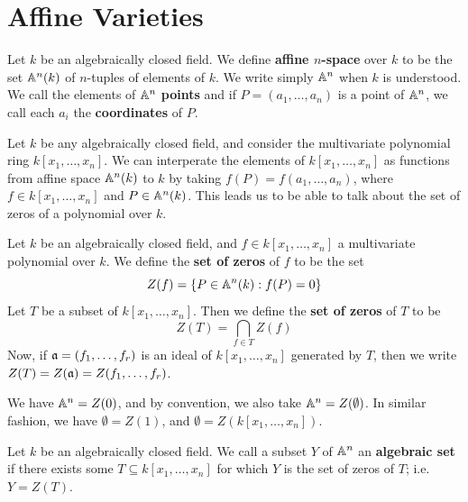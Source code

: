 \section{Affine Varieties}

\begin{definition}
    Let $k$ be an algebraically closed field. We define  \textbf{affine
    $n$-space} over $k$ to be the set $\mathbb{A}^n(k)$ of $n$-tuples of elements of
    $k$. We write simply $\mathbb{A}^n$ when  $k$ is understood. We call the elements of
    $\mathbb{A}^n$  \textbf{points} and if $P=(a_1, \dots, a_n)$ is a point of $\mathbb{A}^n$,
    we call each $a_i$ the \textbf{coordinates} of $P$.
\end{definition}

\begin{example}\label{example_1.1}
    Let $k$ be any algebraically closed field, and consider the multivariate
    polynomial ring $k[x_1, \dots, x_n]$. We can interperate the elements of
    $k[x_1, \dots, x_n]$ as functions from affine space $\mathbb{A}^n(k)$ to $k$ by
    taking  $f(P)=f(a_1, \dots, a_n)$, where $f \in k[x_1, \dots, x_n]$ and $P
    \in \mathbb{A}^n(k)$. This leads us to be able to talk about the set of zeros of a
    polynomial over $k$.
\end{example}

\begin{definition}
    Let $k$ be an algebraically closed field, and $f \in k[x_1, \dots, x_n]$ a
    multivariate polynomial over $k$. We define the \textbf{set of zeros} of $f$
    to be the set
    \begin{equation*}
        Z(f)=\{P \in \mathbb{A}^n(k) : f(P)=0\}
    \end{equation*}
    Let $T$ be a subset of  $k[x_1, \dots, x_n]$. Then we define the \textbf{set
    of zeros} of $T$ to be
    \begin{equation*}
        Z(T)=\bigcap_{f \in T}{Z(f)}
    \end{equation*}
    Now, if $\mathfrak{a}=(f_1, \dots, f_r)$ is an ideal of  $k[x_1, \dots, x_n]$ generated
    by $T$, then we write  $Z(T)=Z(\mathfrak{a})=Z(f_1, \dots, f_r)$.
\end{definition}

\begin{example}\label{example_1.2}
    We have $\mathbb{A}^n=Z(0)$, and by convention, we also take $\mathbb{A}^n=Z(\emptyset)$. In
    similar fashion, we have $\emptyset=Z(1)$, and $\emptyset=Z(k[x_1, \dots,
    x_n])$.
\end{example}

\begin{definition}
    Let $k$ be an algebraically closed field. We call a subset $Y$ of $\mathbb{A}^n$ an
    \textbf{algebraic set} if there exists some $T \subseteq k[x_1, \dots, x_n]$
    for which $Y$ is the set of zeros of $T$; i.e. $Y=Z(T)$.
\end{definition}

